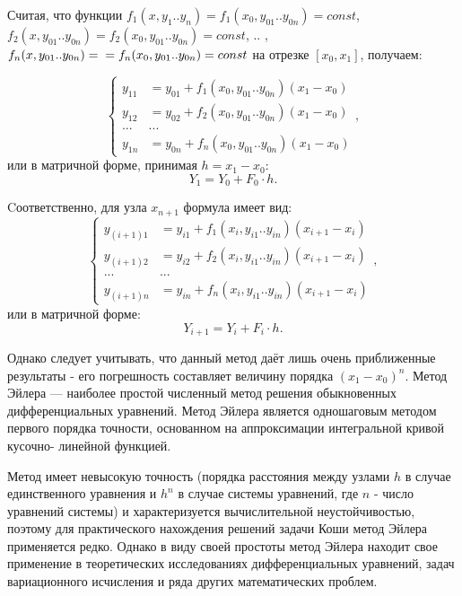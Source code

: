 Считая, что функции $ f_1(x,y_1..y_n)=f_1(x_0,y_{01}..y_{0n})=const$,\\ $ f_2(x,y_{01}..y_{0n})=f_2(x_0,y_{01}..y_{0n})=const$, .. ,$f_n(x,y_{01}..y_{0n})=\\=f_n(x_0,y_{01}..y_{0n})=const$ на отрезке $[x_0,x_1]$, получаем:

$$\left\{\begin{array}{cc}
y_{11} & = y_{01}+f_1(x_0,y_{01}..y_{0n})(x_1-x_0)\\
y_{12} & = y_{02}+f_2(x_0,y_{01}..y_{0n})(x_1-x_0)\\
...&...\\
y_{1n} & = y_{0n}+f_n(x_0,y_{01}..y_{0n})(x_1-x_0)
\end{array}\right.,
$$ или в матричной форме, принимая $h=x_1-x_0$:
$$Y_1=Y_0+F_0\cdot h.$$

Cоответственно, для узла $x_{n+1}$ формула имеет вид:
$$\left\{\begin{array}{cc}
y_{(i+1)1} & = y_{i1}+f_1(x_i,y_{i1}..y_{in})(x_{i+1}-x_i)\\
y_{(i+1)2} & = y_{i2}+f_2(x_i,y_{i1}..y_{in})(x_{i+1}-x_i)\\
...&...\\
y_{(i+1)n} & = y_{in}+f_n(x_i,y_{i1}..y_{in})(x_{i+1}-x_i)
\end{array}\right.,
$$ или в матричной форме:
$$Y_{i+1}=Y_i+F_i \cdot h.$$

Однако следует учитывать, что данный метод даёт лишь очень приближенные результаты - его погрешность составляет величину порядка $(x_1-x_0)^n$.
\clearpage
{}
Метод Эйлера — наиболее простой численный метод решения обыкновенных дифференциальных уравнений. Метод Эйлера является  одношаговым методом первого порядка точности, основанном на аппроксимации интегральной кривой кусочно- линейной функцией.

Метод имеет невысокую точность (порядка расстояния между узлами $h$ в случае единственного уравнения и $h^n$ в случае системы уравнений, где $n$ - число уравнений системы) и характеризуется вычислительной неустойчивостью, поэтому для практического нахождения решений задачи Коши метод Эйлера применяется редко. Однако в виду своей простоты метод Эйлера находит свое применение в теоретических исследованиях дифференциальных уравнений, задач вариационного исчисления и ряда других математических проблем.
\clearpage
{}
\vspace{-1.2cm}


